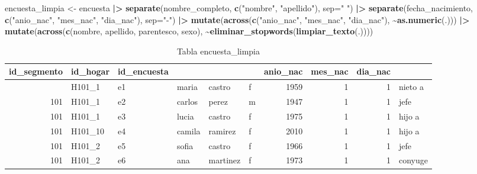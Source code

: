 \documentclass[
  12pt,
]{book}
\newenvironment{Shaded}{\begin{snugshade}}{\end{snugshade}}
\newcommand{\AttributeTok}[1]{\textcolor[rgb]{0.13,0.29,0.53}{#1}}
\newcommand{\FunctionTok}[1]{\textcolor[rgb]{0.13,0.29,0.53}{\textbf{#1}}}
\newcommand{\NormalTok}[1]{#1}
\newcommand{\OtherTok}[1]{\textcolor[rgb]{0.56,0.35,0.01}{#1}}
\newcommand{\SpecialCharTok}[1]{\textcolor[rgb]{0.81,0.36,0.00}{\textbf{#1}}}
\newcommand{\StringTok}[1]{\textcolor[rgb]{0.31,0.60,0.02}{#1}}
\begin{document}
\begin{Shaded}
\begin{Highlighting}[]
\NormalTok{encuesta\_limpia }\OtherTok{\textless{}{-}}\NormalTok{ encuesta }\SpecialCharTok{|\textgreater{}} 
                   \FunctionTok{separate}\NormalTok{(nombre\_completo, }\FunctionTok{c}\NormalTok{(}\StringTok{"nombre"}\NormalTok{, }\StringTok{"apellido"}\NormalTok{), }\AttributeTok{sep=}\StringTok{" "}\NormalTok{) }\SpecialCharTok{|\textgreater{}} 
                   \FunctionTok{separate}\NormalTok{(fecha\_nacimiento, }\FunctionTok{c}\NormalTok{(}\StringTok{"anio\_nac"}\NormalTok{, }\StringTok{"mes\_nac"}\NormalTok{, }\StringTok{"dia\_nac"}\NormalTok{), }\AttributeTok{sep=}\StringTok{"{-}"}\NormalTok{) }\SpecialCharTok{|\textgreater{}} 
                   \FunctionTok{mutate}\NormalTok{(}\FunctionTok{across}\NormalTok{(}\FunctionTok{c}\NormalTok{(}\StringTok{"anio\_nac"}\NormalTok{, }\StringTok{"mes\_nac"}\NormalTok{, }\StringTok{"dia\_nac"}\NormalTok{), }\SpecialCharTok{\textasciitilde{}}\FunctionTok{as.numeric}\NormalTok{(.))) }\SpecialCharTok{|\textgreater{}}   
                   \FunctionTok{mutate}\NormalTok{(}\FunctionTok{across}\NormalTok{(}\FunctionTok{c}\NormalTok{(nombre, apellido, parentesco, sexo),}
                                 \SpecialCharTok{\textasciitilde{}}\FunctionTok{eliminar\_stopwords}\NormalTok{(}\FunctionTok{limpiar\_texto}\NormalTok{(.))))}
\end{Highlighting}
\end{Shaded}

\begin{table}[t]
\caption*{
{\fontsize{20}{25}\selectfont  Tabla encuesta\_limpia\fontsize{12}{15}\selectfont }
} 
\fontsize{12.0pt}{14.0pt}\selectfont
\begin{tabular*}{\linewidth}{@{\extracolsep{\fill}}rlllllrrrl}
\toprule
id\_segmento & id\_hogar & id\_encuesta & {\bfseries \cellcolor[HTML]{F9F9F9}{nombre}} & {\bfseries \cellcolor[HTML]{F9F9F9}{apellido}} & {\bfseries \cellcolor[HTML]{F9F9F9}{sexo}} & anio\_nac & mes\_nac & dia\_nac & {\bfseries \cellcolor[HTML]{F9F9F9}{parentesco}} \\ 
\midrule\addlinespace[2.5pt]
101 & H101\_1 & e1 & maria & castro & f & 1959 & 1 & 1 & nieto a \\ 
101 & H101\_1 & e2 & carlos & perez & m & 1947 & 1 & 1 & jefe \\ 
101 & H101\_1 & e3 & lucia & castro & f & 1975 & 1 & 1 & hijo a \\ 
101 & H101\_10 & e4 & camila & ramirez & f & 2010 & 1 & 1 & hijo a \\ 
101 & H101\_2 & e5 & sofia & castro & f & 1966 & 1 & 1 & jefe \\ 
101 & H101\_2 & e6 & ana & martinez & f & 1973 & 1 & 1 & conyuge \\ 
\bottomrule
\end{tabular*}
\end{table}
\end{document}
